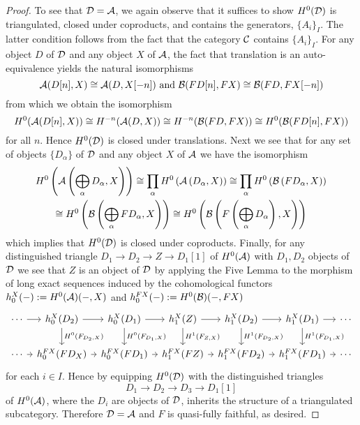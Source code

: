 \begin{proof}
  To see that \(\mathcal{D} = \mathcal{A}\), we again observe that it suffices to show \(H^0(\mathcal{D})\) is triangulated, closed under coproducts, and contains the generators, \(\{A_i\}_I\).
  The latter condition follows from the fact that the category \(\mathcal{C}\) contains \(\{A_i\}_I\).
  For any object \(D\) of \(\mathcal{D}\) and any object \(X\) of \(\mathcal{A}\), the fact that translation is an auto-equivalence yields the natural isomorphisms
  \[\A(D[n], X) \cong \A(D, X[-n])\ \text{and}\ \B(FD[n], FX) \cong \B(FD, FX[-n])\]
  from which we obtain the isomorphism
  \[H^0(\mathcal{A}(D[n], X)) \cong H^{-n}(\mathcal{A}(D,X)) \cong H^{-n}(\mathcal{B}(FD, FX)) \cong H^0(\mathcal{B}(FD[n], FX))\]
  for all \(n\).
  Hence \(H^0(\mathcal{D})\) is closed under translations.
  Next we see that for any set of objects \(\{D_\alpha\}\) of \(\mathcal{D}\) and any object \(X\) of \(\mathcal{A}\) we have the isomorphism
  \begin{gather*}
    H^0\left(\mathcal{A}\left(\bigoplus_\alpha D_\alpha, X\right)\right)
  \cong \prod_\alpha H^0\left(\mathcal{A}\left(D_\alpha, X\right)\right)
    \cong \prod_\alpha H^0\left(\mathcal{B}\left(FD_\alpha, X\right)\right)\\
    \cong H^0\left(\mathcal{B}\left(\bigoplus_\alpha FD_\alpha, X\right)\right)
    \cong H^0\left(\mathcal{B}\left(F\left(\bigoplus_\alpha D_\alpha\right), X\right)\right)
  \end{gather*}
  which implies that \(H^0(\mathcal{D})\) is closed under coproducts.
  Finally, for any distinguished triangle \(D_1 \to D_2 \to Z \to D_1[1]\) of \(H^0(\mathcal{A})\) with \(D_1, D_2\) objects of \(\mathcal{D}\) we see that \(Z\) is an object of \(\mathcal{D}\) by applying the Five Lemma to the morphism of long exact sequences induced by the cohomological functors \(h^X_0(-) := H^0(\mathcal{A})(-, X)\) and \(h^{FX}_0(-) := H^0(\mathcal{B})(-, FX)\)
  \[\begin{tikzcd}[column sep=tiny]
  \cdots \arrow{r} & h^X_0(D_2) \arrow{r}\arrow{d}{H^0(F_{D_2,X})} & h^X_0(D_1) \arrow{r}\arrow{d}{H^0(F_{D_1,X})} & h^X_1(Z) \arrow{r}\arrow{d}{H^1(F_{Z,X})} & h^X_1(D_2) \arrow{r}\arrow{d}{H^1(F_{D_2,X})} & h^X_1(D_1) \arrow{d}{H^1(F_{D_1,X})}\arrow{r}& \cdots\\
  \cdots \arrow{r} & h^{FX}_0(FD_X) \arrow{r} & h^{FX}_0(FD_1) \arrow{r} & h^{FX}_1(FZ) \arrow{r} & h^{FX}_1(FD_2) \arrow{r} & h^{FX}_1(FD_1)\arrow{r} & \cdots
  \end{tikzcd}\]
  for each \(i \in I\).
  Hence by equipping \(H^0(\mathcal{D})\) with the distinguished triangles
  \[D_1 \to D_2 \to D_3 \to D_1[1]\]
  of \(H^0(\mathcal{A})\), where the \(D_i\) are objects of \(\mathcal{D}\), inherits the structure of a triangulated subcategory.
  Therefore \(\mathcal{D} = \mathcal{A}\) and \(F\) is quasi-fully faithful, as desired.
\end{proof}

